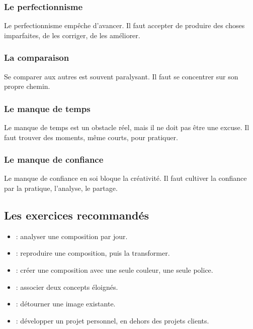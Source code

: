 \subsubsection{Le perfectionnisme}

Le perfectionnisme empêche d'avancer. Il faut accepter de produire des choses imparfaites, de les corriger, de les améliorer.

\subsubsection{La comparaison}

Se comparer aux autres est souvent paralysant. Il faut se concentrer sur son propre chemin.

\subsubsection{Le manque de temps}

Le manque de temps est un obstacle réel, mais il ne doit pas être une excuse. Il faut trouver des moments, même courts, pour pratiquer.

\subsubsection{Le manque de confiance}

Le manque de confiance en soi bloque la créativité. Il faut cultiver la confiance par la pratique, l'analyse, le partage.

\subsection{Les exercices recommandés}

\begin{itemize}
    \item {} : analyser une composition par jour.
    \item {} : reproduire une composition, puis la transformer.
    \item {} : créer une composition avec une seule couleur, une seule police.
    \item {} : associer deux concepts éloignés.
    \item {} : détourner une image existante.
    \item {} : développer un projet personnel, en dehors des projets clients.
\end{itemize}

